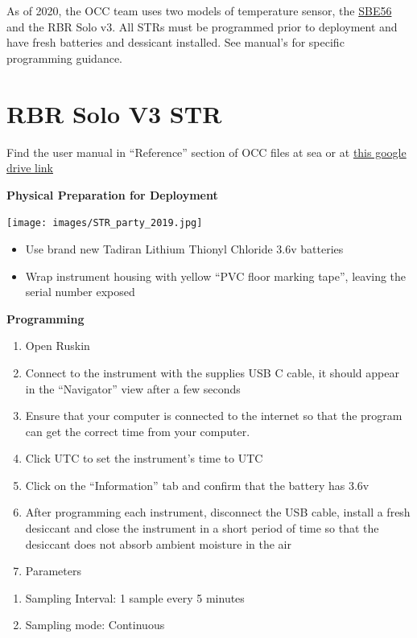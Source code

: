\documentclass[]{book}
\begin{document}
As of 2020, the OCC team uses two models of temperature sensor, the \protect\hyperlink{sbe56}{SBE56} and the RBR Solo v3. All STRs must be programmed prior to deployment and have fresh batteries and dessicant installed. See manual's for specific programming guidance.

\hypertarget{rbr-solo-v3-str}{%
\section{RBR Solo V3 STR}\label{rbr-solo-v3-str}}

Find the user manual in ``Reference'' section of OCC files at sea or at \href{https://drive.google.com/drive/folders/1U-g1gTLOArcf7o5yXx-76z2HU-ha1qCJ}{this google drive link}

\textbf{Physical Preparation for Deployment}

\texttt{[image: images/STR\_party\_2019.jpg]}

\begin{itemize}
\item
  Use brand new Tadiran Lithium Thionyl Chloride 3.6v batteries
\item
  Wrap instrument housing with yellow ``PVC floor marking tape'', leaving the serial number exposed
\end{itemize}

\textbf{Programming}

\begin{enumerate}
\def\labelenumi{\arabic{enumi}.}
\item
  Open Ruskin
\item
  Connect to the instrument with the supplies USB C cable, it should appear in the ``Navigator'' view after a few seconds
\item
  Ensure that your computer is connected to the internet so that the program can get the correct time from your computer.
\item
  Click UTC to set the instrument's time to UTC
\item
  Click on the ``Information'' tab and confirm that the battery has 3.6v
\item
  After programming each instrument, disconnect the USB cable, install a fresh desiccant and close the instrument in a short period of time so that the desiccant does not absorb ambient moisture in the air
\item
  Parameters
\end{enumerate}

\begin{enumerate}
\def\labelenumi{\alph{enumi}.}
\item
  Sampling Interval: 1 sample every 5 minutes
\item
  Sampling mode: Continuous
\end{enumerate}
\end{document}
